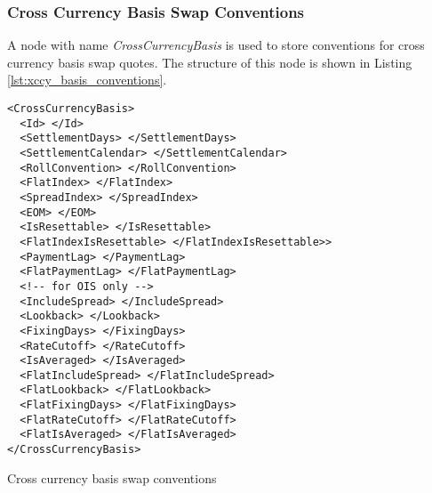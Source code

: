 \subsubsection{Cross Currency Basis Swap Conventions}
A node with name \emph{CrossCurrencyBasis} is used to store conventions for cross currency basis swap quotes. The
structure of this node is shown in Listing \ref{lst:xccy_basis_conventions}.

\begin{listing}[H]
\begin{verbatim}
<CrossCurrencyBasis>
  <Id> </Id>
  <SettlementDays> </SettlementDays>
  <SettlementCalendar> </SettlementCalendar>
  <RollConvention> </RollConvention>
  <FlatIndex> </FlatIndex>
  <SpreadIndex> </SpreadIndex>
  <EOM> </EOM>
  <IsResettable> </IsResettable>
  <FlatIndexIsResettable> </FlatIndexIsResettable>>
  <PaymentLag> </PaymentLag>
  <FlatPaymentLag> </FlatPaymentLag>
  <!-- for OIS only -->
  <IncludeSpread> </IncludeSpread>
  <Lookback> </Lookback>
  <FixingDays> </FixingDays>
  <RateCutoff> </RateCutoff>
  <IsAveraged> </IsAveraged>
  <FlatIncludeSpread> </FlatIncludeSpread>
  <FlatLookback> </FlatLookback>
  <FlatFixingDays> </FlatFixingDays>
  <FlatRateCutoff> </FlatRateCutoff>
  <FlatIsAveraged> </FlatIsAveraged>
</CrossCurrencyBasis>
\end{verbatim}
\caption{Cross currency basis swap conventions}
\label{lst:xccy_basis_conventions}
\end{listing}


